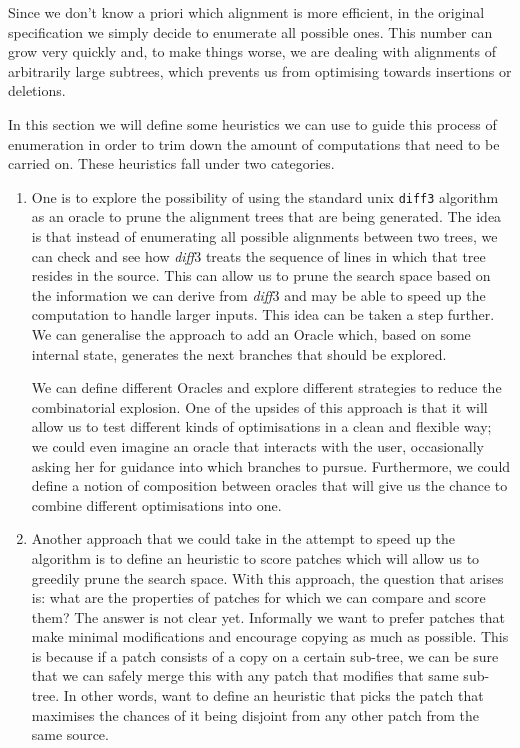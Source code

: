 \documentclass[11pt, titlepage]{article}
\newcommand{\diff}{\emph{diff}}
\begin{document}
Since we don't know a priori which alignment is more efficient, in the original specification we simply decide to enumerate all possible ones. This number can grow very quickly and, to make things worse, we are dealing with alignments of arbitrarily large subtrees, which prevents
us from optimising towards insertions or deletions.

In this section we will define some heuristics we can use to guide this process of enumeration in order to trim down the amount of computations that need to be carried on.
These heuristics fall under two categories.

\begin{enumerate}
\item One is to explore the possibility of using the standard unix \texttt{diff3} algorithm as an oracle to prune the alignment trees that are being generated. 
The idea is that instead of enumerating all possible alignments between two trees, we can check and see how \diff3 treats the sequence of lines in which that tree resides in the source. This can allow us to prune the search space based on the information we can derive from \diff3 and may be able to speed up the computation to handle larger inputs. This idea can be taken a step further. We can generalise the approach to add an Oracle which, based on some internal state, generates the next branches that should be explored.

We can define different Oracles and explore different strategies to reduce the combinatorial explosion. 
One of the upsides of this approach is that it will allow us to test different kinds of optimisations in a clean and flexible way; we could even imagine an oracle that interacts with the user, occasionally asking her for guidance into which branches to pursue. 
Furthermore, we could define a notion of composition between oracles that will give us the chance to combine different optimisations into one.


\item Another approach that we could take in the attempt to speed up the algorithm is to define an heuristic to score patches which will allow us to greedily prune the search space. 
With this approach, the question that arises is: what are the properties of patches for which we can compare and score them? The answer is not clear yet. Informally we want to prefer patches that make minimal modifications and encourage copying as much as possible. This is because 
if a patch consists of a copy on a certain sub-tree, we can be sure that we can 
safely merge this with any patch that modifies that same sub-tree. 
In other words, want to define an heuristic that picks the patch that maximises the chances of it being disjoint from any other patch from the same source.
\end{enumerate}
\end{document}
